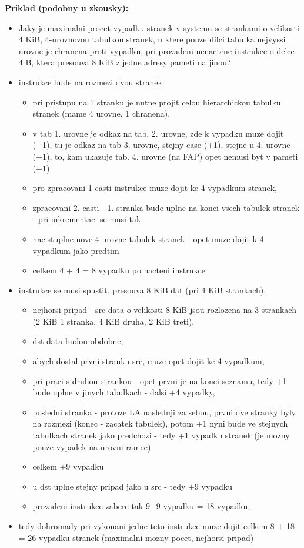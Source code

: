 \documentclass[a4paper, 11pt]{article}
\begin{document}
\textbf{Priklad (podobny u zkousky):}
\begin{itemize}
    \item Jaky je maximalni procet vypadku stranek v systemu se strankami o velikosti 4 KiB, 4-urovnovou tabulkou stranek, u ktere pouze dilci tabulka nejvyssi urovne je chranena proti vypadku, pri provadeni nenactene instrukce o delce 4 B, ktera presouva 8 KiB z jedne adresy pameti na jinou?
    \item instrukce bude na rozmezi dvou stranek
    \begin{itemize}
    \item pri pristupu na 1 stranku je nutne projit celou hierarchickou tabulku stranek (mame 4 urovne, 1 chranena),
    \item v tab 1. urovne je odkaz na tab. 2. urovne, zde k vypadku muze dojit (+1), tu je odkaz na tab 3. urovne, stejny case (+1), stejne u 4. urovne (+1), to, kam ukazuje tab. 4. urovne (na FAP) opet nemusi byt v pameti (+1)
    \item pro zpracovani 1 casti instrukce muze dojit ke 4 vypadkum stranek,
    \item zpracovani 2. casti - 1. stranka bude uplne na konci vsech tabulek stranek - pri inkrementaci se musi tak     \item nacistuplne nove 4 urovne tabulek stranek - opet muze dojit k 4 vypadkum jako predtim
    \item celkem 4 + 4 = 8 vypadku po nacteni instrukce
    \end{itemize}
    \item instrukce se musi spustit, presouva 8 KiB dat (pri 4 KiB strankach), 
    \begin{itemize}
        \item nejhorsi pripad - src data o velikosti 8 KiB jsou rozlozena na 3 strankach (2 KiB 1 stranka, 4 KiB druha, 2 KiB treti),
    \item dst data budou obdobne,
    \item abych dostal prvni stranku src, muze opet dojit ke 4 vypadkum,
    \item pri praci s druhou strankou - opet prvni je na konci seznamu, tedy +1 bude uplne v jinych tabulkach - dalsi +4 vypadky,
    \item posledni stranka - protoze LA nasleduji za sebou, prvni dve stranky byly na rozmezi (konec - zacatek tabulek), potom +1 nyni bude ve stejnych tabulkach stranek jako predchozi - tedy +1 vypadku stranek (je mozny pouze vypadek na urovni ramce)
    \item celkem +9 vypadku
    \item u dst uplne stejny pripad jako u src - tedy +9 vypadku
    \item provadeni instrukce zabere tak 9+9 vypadku = 18 vypadku, \\
    \end{itemize}
    \item tedy dohromady pri vykonani jedne teto instrukce muze dojit celkem 8 + 18 = 26 vypadku stranek (maximalni mozny pocet, nejhorsi pripad) \\
\end{itemize}
\end{document}
